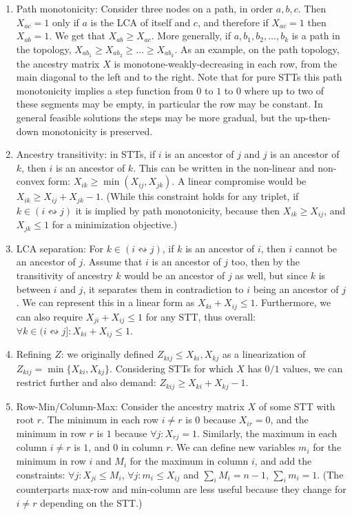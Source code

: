 \begin{enumerate}
    \item Path monotonicity: Consider three nodes on a path, in order $a,b,c$. Then $X_{ac} = 1$ only if $a$ is the LCA of itself and $c$, and therefore if $X_{ac} = 1$ then   $X_{ab} = 1$. We get that $X_{ab} \ge X_{ac}$. More generally, if $a,b_1,b_2,\ldots,b_k$ is a path in the topology, $X_{ab_1} \ge X_{ab_2} \ge \ldots \ge X_{ab_k}$. As an example, on the path topology, the ancestry matrix $X$ is monotone-weakly-decreasing in each row, from the main diagonal to the left and to the right. Note that for pure STTs this path monotonicity implies a step function from $0$ to $1$ to $0$ where up to two of these segments may be empty, in particular the row may be constant. In general feasible solutions the steps may be more gradual, but the up-then-down monotonicity is preserved.

    \item Ancestry transitivity: in STTs, if $i$ is an ancestor of $j$ and $j$ is an ancestor of $k$, then $i$ is an ancestor of $k$. This can be written in the non-linear and non-convex form: $X_{ik} \ge \min(X_{ij},X_{jk})$. A linear compromise would be $X_{ik} \ge X_{ij} + X_{jk} - 1$. (While this constraint holds for any triplet, if $k \in (i \leftrightsquigarrow j)$ it is implied by path monotonicity, because then $X_{ik} \ge X_{ij}$, and $X_{jk} \le 1$ for a minimization objective.)

    \item LCA separation: For $k \in (i \leftrightsquigarrow j)$, if $k$ is an ancestor of $i$, then $i$ cannot be an ancestor of $j$. Assume that $i$ is an ancestor of $j$ too, then by the transitivity of ancestry $k$ would be an ancestor of $j$ as well, but since $k$ is between $i$ and $j$, it separates them in contradiction to $i$ being an ancestor of $j$. We can represent this in a linear form as $X_{ki} + X_{ij} \le 1$. Furthermore, we can also require $X_{ji} + X_{ij} \le 1$ for any STT, thus overall: $\forall k \in (i \leftrightsquigarrow j]: X_{ki} + X_{ij} \le 1$.

    \item Refining $Z$: we originally defined $Z_{kij} \le X_{ki},X_{kj}$ as a linearization of $Z_{kij} = \min \{ X_{ki},X_{kj} \} $. Considering STTs for which $X$ has $0/1$ values, we can restrict further and also demand: $Z_{kij} \ge X_{ki} + X_{kj} - 1$.

    \item Row-Min/Column-Max: Consider the ancestry matrix $X$ of some STT with root $r$. The minimum in each row $i \ne r$ is $0$ because $X_{ir} = 0$, and the minimum in row $r$ is $1$ because $\forall j: X_{rj} = 1$. Similarly, the maximum in each column $i \ne r$ is $1$, and $0$ in column $r$. We can define new variables $m_i$ for the minimum in row $i$ and $M_i$ for the maximum in column $i$, and add the constraints: $\forall j: X_{ji} \le M_i$, $\forall j: m_i \le X_{ij}$ and $\sum_{i}{M_i} = n-1$, $\sum_{i}{m_i} = 1$. (The counterparts max-row and min-column are less useful because they change for $i \ne r$ depending on the STT.)
\end{enumerate}

